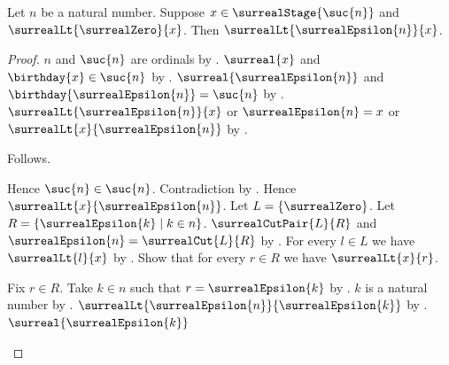 \begin{theorem}\label{positive_finite_surreal_dominates_epsilon}
    Let $n$ be a natural number.
    Suppose $x\in\surrealStage{\suc{n}}$ and
        $\surrealLt{\surrealZero}{x}$.
    Then $\surrealLt{\surrealEpsilon{n}}{x}$.
\end{theorem}
\begin{proof}
    $n$ and $\suc{n}$ are ordinals
        by .
    $\surreal{x}$ and $\birthday{x}\in\suc{n}$
        by .
    $\surreal{\surrealEpsilon{n}}$ and
        $\birthday{\surrealEpsilon{n}}=\suc{n}$
        by .
    $\surrealLt{\surrealEpsilon{n}}{x}$ or
        $\surrealEpsilon{n}=x$ or
        $\surrealLt{x}{\surrealEpsilon{n}}$
        by .
    \begin{byCase}
            Follows.
            \begin{byCase}
                    Hence $\suc{n}\in\suc{n}$.
                    Contradiction by .
                    Hence $\surrealLt{x}{\surrealEpsilon{n}}$.
                    Let $L=\{\surrealZero\}$.
                    Let $R=\{\surrealEpsilon{k}\mid k\in n\}$.
                    $\surrealCutPair{L}{R}$ and
                        $\surrealEpsilon{n}=\surrealCut{L}{R}$
                        by
                        .
                    For every $l\in L$ we have $\surrealLt{l}{x}$
                        by .
                    Show that for every $r\in R$ we have
                        $\surrealLt{x}{r}$.
                    \begin{subproof}
                        Fix $r\in R$.
                        Take $k\in n$ such that
                            $r=\surrealEpsilon{k}$
                            by .
                        $k$ is a natural number
                            by
                            .
                        $\surrealLt{\surrealEpsilon{n}}
                            {\surrealEpsilon{k}}$
                            by .
                        $\surreal{\surrealEpsilon{k}}$

\end{subproof}
\end{byCase}
\end{byCase}
\end{proof}
